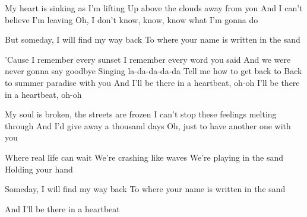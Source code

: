 \begin{verse*}
My heart is sinking as I'm lifting
Up above the clouds away from you
And I can't believe I'm leaving
Oh, I don't know, know, know what I'm gonna do
\end{verse*}

\begin{verse*}
But someday, I will find my way back
To where your name is written in the sand
\end{verse*}

\begin{chorus}
'Cause I remember every sunset
I remember every word you said
And we were never gonna say goodbye
Singing la-da-da-da-da
Tell me how to get back to
Back to summer paradise with you
And I'll be there in a heartbeat, oh-oh
I'll be there in a heartbeat, oh-oh
\end{chorus}

\begin{verse*}
My soul is broken, the streets are frozen
I can't stop these feelings melting through
And I'd give away a thousand days
Oh, just to have another one with you
\end{verse*}

\begin{verse*}
Where real life can wait
We're crashing like waves
We're playing in the sand
Holding your hand
\end{verse*}

\thechorus

\begin{verse*}
Someday, I will find my way back
To where your name is written in the sand
\end{verse*}

\thechorus

\begin{verse*}
And I'll be there in a heartbeat
\end{verse*}

